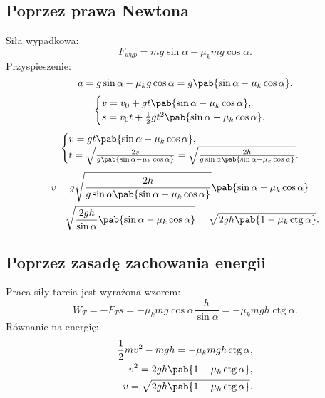 \documentclass{article}
\DeclareMathOperator{\ctg}{ctg}
\newcommand{\inv}[1]{\frac{1}{#1}}
\begin{document}
\subsection{Poprzez prawa Newtona}
Siła wypadkowa:
\begin{equation}
F_{wyp} = mg \sin\alpha - \mu_{k}mg \cos\alpha.
\end{equation}
Przyspieszenie:
\begin{equation}
a = g \sin\alpha - \mu_{k}g \cos\alpha = g \pab{\sin\alpha - \mu_{k} \cos\alpha}.
\end{equation}
\begin{equation*}
\begin{cases}
v = v_0 + g t \pab{\sin\alpha - \mu_{k} \cos\alpha}, \\
s = v_0 t + \inv{2} g t^2 \pab{\sin\alpha - \mu_{k} \cos\alpha}.
\end{cases}
\end{equation*}
\begin{equation*}
\begin{cases}
v = g t \pab{\sin\alpha - \mu_{k} \cos\alpha}, \\
t = \sqrt{\frac{2s}{g \pab{\sin\alpha - \mu_{k} \cos\alpha}}} = \sqrt{\frac{2h}{g \sin\alpha \pab{\sin\alpha - \mu_{k} \cos\alpha}}}.
\end{cases}
\end{equation*}
\begin{equation}
\begin{split}
v = g \sqrt{\frac{2h}{g \sin\alpha \pab{\sin\alpha - \mu_{k} \cos\alpha}}} \pab{\sin\alpha - \mu_{k} \cos\alpha} = \\
= \sqrt{\frac{2gh}{\sin\alpha } \pab{\sin\alpha - \mu_{k} \cos\alpha}} = \sqrt{2gh \pab{1 - \mu_{k} \ctg\alpha}}.
\end{split}
\end{equation}
\subsection{Poprzez zasadę zachowania energii}
Praca siły tarcia jest wyrażona wzorem:
\begin{equation}
W_{T} = - F_{T} s = - \mu_{k} mg \cos\alpha \frac{h}{\sin\alpha} = - \mu_{k}mgh \ctg\alpha.
\end{equation}
Równanie na energię:
\begin{equation}
\begin{split}
\inv{2}mv^2 - mgh = - \mu_{k}mgh \ctg\alpha, \\
v^2 = 2gh\pab{1 - \mu_{k} \ctg\alpha}, \\
v = \sqrt{2gh\pab{1 - \mu_{k} \ctg\alpha}}.
\end{split}
\end{equation}
\end{document}

